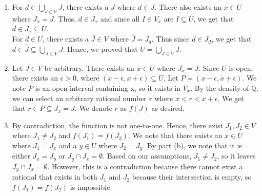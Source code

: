 \documentclass{article}
\begin{document}
\begin{enumerate}
\begin{enumerate}
\item
For $d \in \bigcup_{J \in V} J$, there exists a $J$ where $d \in J$. There also exists an $x \in U$ where $J_x = J$. Thus, $d \in J_x$ and since all $I \in V_x$ are $I \subseteq U$, we get that $d \in J_x \subseteq U$. \\

For $d \in U$, there exists a $\hat{J} \in V$ where $\hat{J} = J_d$. Thus since $d \in J_d$, we get that $d \in \hat{J} \subseteq \bigcup_{J \in V} J$. Hence, we proved that $U = \bigcup_{J \in V} J$.  \\

\item
Let $J \in V$ be arbitrary. There exists an $x \in U$ where $J_x = J$. Since $U$ is open, there exists an $\epsilon > 0$, where $(x - \epsilon, x + \epsilon) \subseteq U$. Let $P = (x - \epsilon, x + \epsilon)$. We note $P$ is an open interval containing x, so it exists in $V_x$. By the density of $\mathbb{Q}$, we can select an arbitrary rational number $r$ where $x < r < x + \epsilon$. We get that $ r \in P \subseteq J_x = J$. We denote $r$ as $f(J)$ as desired. \\

\item
By contradiction, the function is not one-to-one. Hence, there exist $J_1, J_2 \in V$ where $J_1 \not = J_2$ and $f(J_1) = f(J_2)$. We note that there exists an $x \in U$ where $J_1 = J_x$ and a $y \in U$ where $J_2 = J_y$. By part (b), we note that it is either $J_x = J_y$ or $J_y \cap J_x = \emptyset$. Based on our assumptions, $J_1 \not= J_2$, so it leaves $J_y \cap J_x = \emptyset$. However, this is a contradiction because there cannot exist a rational that exists in both $J_1$ and $J_2$ because their intersection is empty, so $f(J_1) = f(J_2)$ is impossible.
\end{enumerate}


\end{enumerate}
\end{document}
